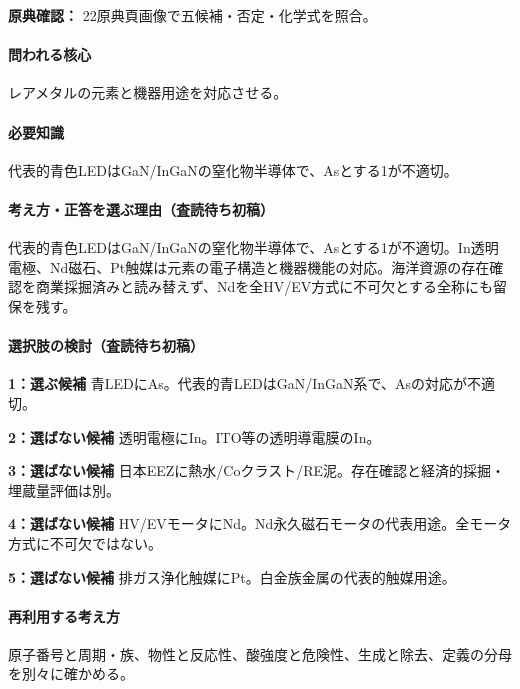 \noindent\textbf{原典確認：} 22原典頁画像で五候補・否定・化学式を照合。\par

\paragraph{問われる核心} レアメタルの元素と機器用途を対応させる。

\paragraph{必要知識} 代表的青色LEDはGaN/InGaNの窒化物半導体で、Asとする1が不適切。

\paragraph{考え方・正答を選ぶ理由（査読待ち初稿）} 代表的青色LEDはGaN/InGaNの窒化物半導体で、Asとする1が不適切。In透明電極、Nd磁石、Pt触媒は元素の電子構造と機器機能の対応。海洋資源の存在確認を商業採掘済みと読み替えず、Ndを全HV/EV方式に不可欠とする全称にも留保を残す。

\paragraph{選択肢の検討（査読待ち初稿）}\mbox{}\par

\noindent\textbf{1：選ぶ候補} 青LEDにAs。代表的青LEDはGaN/InGaN系で、Asの対応が不適切。\par

\noindent\textbf{2：選ばない候補} 透明電極にIn。ITO等の透明導電膜のIn。\par

\noindent\textbf{3：選ばない候補} 日本EEZに熱水/Coクラスト/RE泥。存在確認と経済的採掘・埋蔵量評価は別。\par

\noindent\textbf{4：選ばない候補} HV/EVモータにNd。Nd永久磁石モータの代表用途。全モータ方式に不可欠ではない。\par

\noindent\textbf{5：選ばない候補} 排ガス浄化触媒にPt。白金族金属の代表的触媒用途。\par

\paragraph{再利用する考え方} 原子番号と周期・族、物性と反応性、酸強度と危険性、生成と除去、定義の分母を別々に確かめる。

